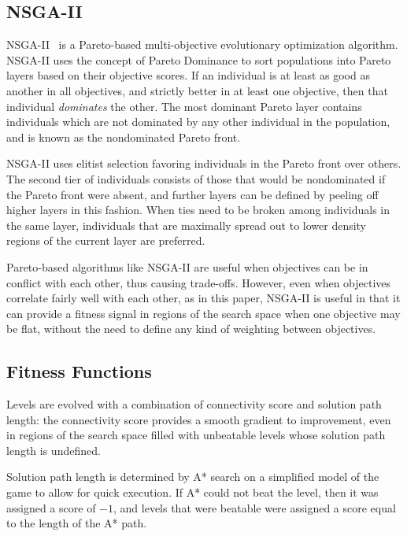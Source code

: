 \subsection{NSGA-II}
NSGA-II~\cite{deb:tec02} is a Pareto-based multi-objective evolutionary optimization algorithm. NSGA-II uses the concept of Pareto Dominance to sort populations into Pareto layers based on their objective scores. If an individual is at least as good as another in all objectives, and strictly better in at least one objective, then that individual \emph{dominates} the other. The most dominant Pareto layer contains individuals which are not dominated by any other individual in the population, and is known as the nondominated Pareto front. 

NSGA-II uses elitist selection favoring individuals in the Pareto front
over others. The second tier of individuals consists of those that would be nondominated if the Pareto front were absent, and further layers can be defined by peeling off higher layers in this fashion. When ties need to be broken among individuals in the same layer, individuals that are maximally spread out to lower density regions of the current layer are preferred.

Pareto-based algorithms like NSGA-II are useful when objectives can be in conflict with each other, thus causing trade-offs. However, even when objectives correlate fairly well with each other, as in this paper, NSGA-II is useful in that it can provide a fitness signal in regions of the search space when one objective may be flat, without the need to define any kind of weighting between objectives. 

\subsection{Fitness Functions}

Levels are evolved with a combination of connectivity score and solution path length: the connectivity score provides a smooth gradient to improvement, even in regions of the search space filled with unbeatable levels whose solution path length is undefined.

Solution path length is determined by A* search 
on a simplified model of the game to allow for quick execution. If A* could not beat the level, then it was assigned a score of $-1$, and levels that were beatable were assigned a score equal to the length of the A* path. 


